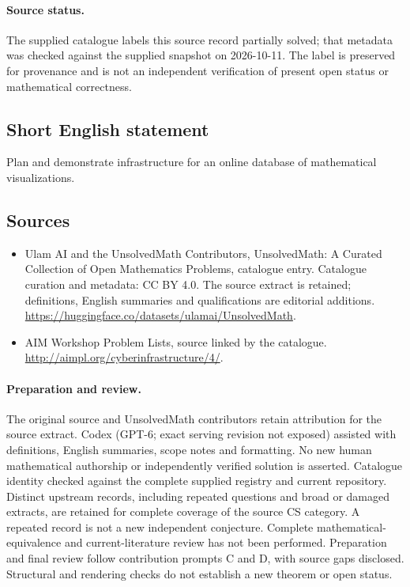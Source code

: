 \documentclass[11pt]{article}
\begin{document}
\paragraph{Source status.}
The supplied catalogue labels this source record partially solved; that metadata was checked against the supplied snapshot on 2026-10-11. The label is preserved for provenance and is not an independent verification of present open status or mathematical correctness.
\subsection{Short English statement}
Plan and demonstrate infrastructure for an online database of mathematical visualizations.
\subsection{Sources}
\begin{itemize}
\item[\hypertarget{source:statement:1}{S1}] Ulam AI and the UnsolvedMath Contributors, UnsolvedMath: A Curated Collection of Open Mathematics Problems, catalogue entry. Catalogue curation and metadata: CC BY 4.0. The source extract is retained; definitions, English summaries and qualifications are editorial additions.
\url{https://huggingface.co/datasets/ulamai/UnsolvedMath}.
\item[\hypertarget{source:statement:2}{S2}] AIM Workshop Problem Lists, source linked by the catalogue.
\url{http://aimpl.org/cyberinfrastructure/4/}.
\end{itemize}
\paragraph{Preparation and review.}
The original source and UnsolvedMath contributors retain attribution for the source extract. Codex (GPT-6; exact serving revision not exposed) assisted with definitions, English summaries, scope notes and formatting. No new human mathematical authorship or independently verified solution is asserted. Catalogue identity checked against the complete supplied registry and current repository. Distinct upstream records, including repeated questions and broad or damaged extracts, are retained for complete coverage of the source CS category. A repeated record is not a new independent conjecture. Complete mathematical-equivalence and current-literature review has not been performed. Preparation and final review follow contribution prompts C and D, with source gaps disclosed. Structural and rendering checks do not establish a new theorem or open status.
\label{end:statement}
\end{document}
